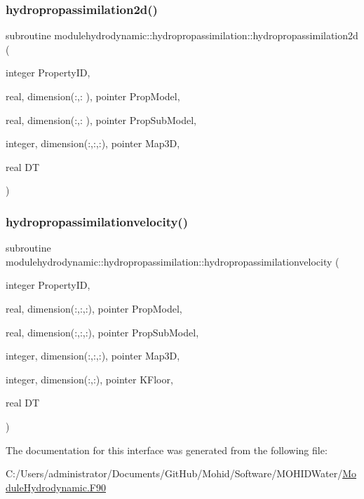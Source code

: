 \subsubsection{\texorpdfstring{hydropropassimilation2d()}{hydropropassimilation2d()}}
{\footnotesize\ttfamily subroutine modulehydrodynamic\+::hydropropassimilation\+::hydropropassimilation2d (\begin{DoxyParamCaption}\item[{integer}]{Property\+ID,  }\item[{real, dimension(\+:,\+:  ), pointer}]{Prop\+Model,  }\item[{real, dimension(\+:,\+:  ), pointer}]{Prop\+Sub\+Model,  }\item[{integer, dimension(\+:,\+:,\+:), pointer}]{Map3D,  }\item[{real}]{DT }\end{DoxyParamCaption})\hspace{0.3cm}{\ttfamily [private]}}

\mbox{\label{interfacemodulehydrodynamic_1_1hydropropassimilation_a230e25209a23ea84a69cc47251354a82}} 
\subsubsection{\texorpdfstring{hydropropassimilationvelocity()}{hydropropassimilationvelocity()}}
{\footnotesize\ttfamily subroutine modulehydrodynamic\+::hydropropassimilation\+::hydropropassimilationvelocity (\begin{DoxyParamCaption}\item[{integer}]{Property\+ID,  }\item[{real, dimension(\+:,\+:,\+:), pointer}]{Prop\+Model,  }\item[{real, dimension(\+:,\+:,\+:), pointer}]{Prop\+Sub\+Model,  }\item[{integer, dimension(\+:,\+:,\+:), pointer}]{Map3D,  }\item[{integer, dimension(\+:,\+:), pointer}]{K\+Floor,  }\item[{real}]{DT }\end{DoxyParamCaption})\hspace{0.3cm}{\ttfamily [private]}}



The documentation for this interface was generated from the following file\+:\begin{DoxyCompactItemize}
\item 
C\+:/\+Users/administrator/\+Documents/\+Git\+Hub/\+Mohid/\+Software/\+M\+O\+H\+I\+D\+Water/\mbox{\hyperlink{_module_hydrodynamic_8_f90}{Module\+Hydrodynamic.\+F90}}\end{DoxyCompactItemize}
